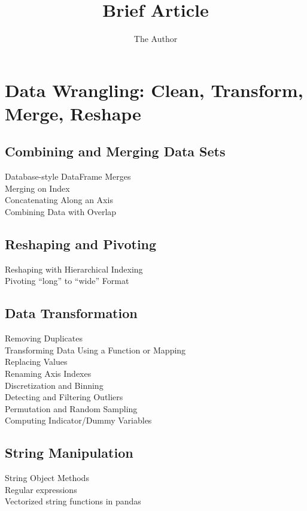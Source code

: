 \documentclass[11pt]{article} %
\title{Brief Article}
\author{The Author}
\begin{document}
\section{Data Wrangling: Clean, Transform, Merge, Reshape}
\subsection{Combining and Merging Data Sets}
Database-style DataFrame Merges\\
Merging on Index\\
Concatenating Along an Axis\\
Combining Data with Overlap\\
\subsection{Reshaping and Pivoting}
Reshaping with Hierarchical Indexing\\
Pivoting “long” to “wide” Format\\
\subsection{Data Transformation}
Removing Duplicates\\
Transforming Data Using a Function or Mapping\\
Replacing Values\\
Renaming Axis Indexes\\
Discretization and Binning\\
Detecting and Filtering Outliers\\
Permutation and Random Sampling\\
Computing Indicator/Dummy Variables\\
\subsection{String Manipulation}
String Object Methods\\
Regular expressions\\
Vectorized string functions in pandas\\
\end{document}
